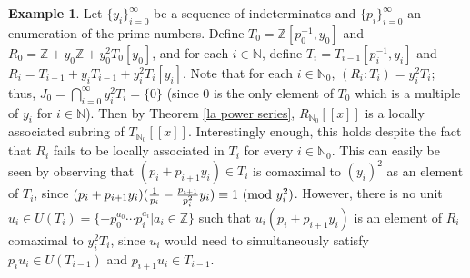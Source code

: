 \documentclass[12pt]{amsart}
\theoremstyle{definition}
\newtheorem{example}[theorem]{Example}
\newcommand{\bZ}{\mathbb Z}
\newcommand{\bQ}{\mathbb Q}
\newcommand{\bN}{\mathbb N}
\newcommand{\bNo}{{{\mathbb N}_0}}
\newcommand{\bR}{\mathbb R}
\newcommand{\modulo}[1]{\textup{ (mod }#1)}
\begin{document}


\begin{example}
    Let $\{y_i\}_{i=0}^\infty$ be a sequence of indeterminates and $\{p_i\}_{i=0}^\infty$ an enumeration of the prime numbers. Define $T_0=\bZ[p_0^{-1},y_0]$ and $R_0=\bZ+y_0\bZ+y_0^2T_0[y_0]$, and for each $i\in\bN$, define $T_i=T_{i-1}[p_i^{-1},y_i]$ and $R_i=T_{i-1}+y_iT_{i-1}+y_i^2T_i[y_i]$. Note that for each $i\in\bNo$, $(R_i:T_i)=y_i^2T_i$; thus, $J_0=\bigcap_{i=0}^\infty y_i^2T_i=\{0\}$ (since 0 is the only element of $T_0$ which is a multiple of $y_i$ for $i\in\bN$). Then by Theorem \ref{la power series}, $R_\bNo[[x]]$ is a locally associated subring of $T_\bNo[[x]]$. Interestingly enough, this holds despite the fact that $R_i$ fails to be locally associated in $T_i$ for every $i\in\bN_0$. This can easily be seen by observing that $(p_i+p_{i+1}y_i)\in T_i$ is comaximal to $(y_i)^2$ as an element of $T_i$, since $(p_i+p_{i+1}y_i)(\frac{1}{p_i}-\frac{p_{i+1}}{p_i^2}y_i)\equiv 1\modulo{y_i^2}$. However, there is no unit $u_i\in U(T_i)=\{\pm p_0^{a_0}\cdots p_i^{a_i}|a_i\in\bZ\}$ such that $u_i(p_i+p_{i+1}y_i)$ is an element of $R_i$ comaximal to $y_i^2T_i$, since $u_i$ would need to simultaneously satisfy $p_iu_i\in U(T_{i-1})$ and $p_{i+1}u_i\in T_{i-1}$.
\end{example}



\end{document}
